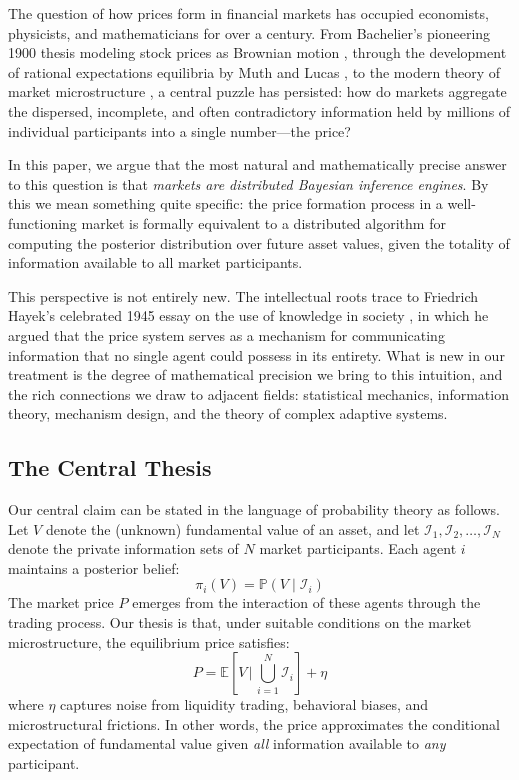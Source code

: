 \documentclass[12pt,a4paper]{article}
\theoremstyle{definition}
\newcommand{\E}{\mathbb{E}}
\newcommand{\Prob}{\mathbb{P}}
\newcommand{\I}{\mathcal{I}}
\begin{document}
The question of how prices form in financial markets has occupied economists, physicists, and mathematicians for over a century. From Bachelier's pioneering 1900 thesis modeling stock prices as Brownian motion \citep{bachelier1900}, through the development of rational expectations equilibria by Muth and Lucas \citep{muth1961,lucas1972}, to the modern theory of market microstructure \citep{ohara1995}, a central puzzle has persisted: how do markets aggregate the dispersed, incomplete, and often contradictory information held by millions of individual participants into a single number---the price?

In this paper, we argue that the most natural and mathematically precise answer to this question is that \emph{markets are distributed Bayesian inference engines}. By this we mean something quite specific: the price formation process in a well-functioning market is formally equivalent to a distributed algorithm for computing the posterior distribution over future asset values, given the totality of information available to all market participants.

This perspective is not entirely new. The intellectual roots trace to Friedrich Hayek's celebrated 1945 essay on the use of knowledge in society \citep{hayek1945}, in which he argued that the price system serves as a mechanism for communicating information that no single agent could possess in its entirety. What is new in our treatment is the degree of mathematical precision we bring to this intuition, and the rich connections we draw to adjacent fields: statistical mechanics, information theory, mechanism design, and the theory of complex adaptive systems.

\subsection{The Central Thesis}

Our central claim can be stated in the language of probability theory as follows. Let $V$ denote the (unknown) fundamental value of an asset, and let $\I_1, \I_2, \ldots, \I_N$ denote the private information sets of $N$ market participants. Each agent $i$ maintains a posterior belief:
\begin{equation}\label{eq:individual_posterior}
    \pi_i(V) = \Prob(V \mid \I_i)
\end{equation}
The market price $P$ emerges from the interaction of these agents through the trading process. Our thesis is that, under suitable conditions on the market microstructure, the equilibrium price satisfies:
\begin{equation}\label{eq:market_posterior}
    P = \E\left[V \,\Big|\, \bigcup_{i=1}^{N} \I_i\right] + \eta
\end{equation}
where $\eta$ captures noise from liquidity trading, behavioral biases, and microstructural frictions. In other words, the price approximates the conditional expectation of fundamental value given \emph{all} information available to \emph{any} participant.
\end{document}
